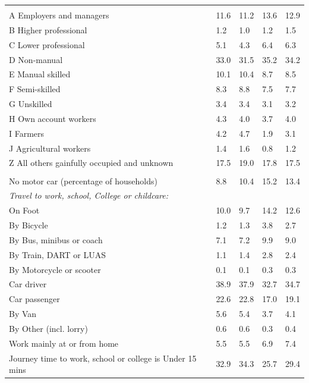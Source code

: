 \documentclass{article}
\begin{document}
\begin{table}[h]
\begin{tabular}{KTTTT}
\hline
    \\ 
    \hline
A Employers and managers & 11.6& 11.2& 13.6& 12.9\\
B Higher professional & 1.2& 1.0& 1.2& 1.5\\
C Lower professional & 5.1& 4.3& 6.4& 6.3\\
D Non-manual & 33.0& 31.5& 35.2& 34.2\\
E Manual skilled & 10.1& 10.4&  8.7&  8.5\\
F Semi-skilled & 8.3& 8.8& 7.5& 7.7\\
G Unskilled & 3.4& 3.4& 3.1& 3.2\\
H Own account workers & 4.3& 4.0& 3.7& 4.0\\
I Farmers & 4.2& 4.7& 1.9& 3.1\\
J Agricultural workers & 1.4& 1.6& 0.8& 1.2\\
Z All others gainfully occupied and unknown & 17.5& 19.0& 17.8& 17.5\\
\hline
{}\hline
    \\ 
    \hline
No motor car (percentage of households) &  8.8& 10.4& 15.2& 
13.4\\
    \hline 
\emph{Travel to work, school, College or childcare:} & & & \\
\quad On Foot & 10.0&  9.7& 14.2& 12.6\\ 
\quad By Bicycle & 1.2& 1.3& 3.8& 2.7\\ 
\quad By Bus, minibus or coach & 7.1& 7.2& 9.9& 9.0\\
\quad By Train, DART or LUAS & 1.1& 1.4& 2.8& 2.4\\
\quad By Motorcycle or scooter & 0.1& 0.1& 0.3& 0.3\\
\quad Car driver & 38.9 & 37.9& 32.7& 34.7\\
\quad Car passenger & 22.6& 22.8& 17.0& 19.1\\
\quad By Van & 5.6& 5.4& 3.7& 4.1\\
\quad By Other (incl. lorry) & 0.6& 0.6& 0.3& 0.4\\
    \hline
Work mainly at or from home & 5.5& 5.5& 6.9& 7.4\\
Journey time to work, school or college is Under 15 mins & 32.9& 34.3& 25.7& 29.4\\

\end{tabular}
\end{table}
\end{document}
